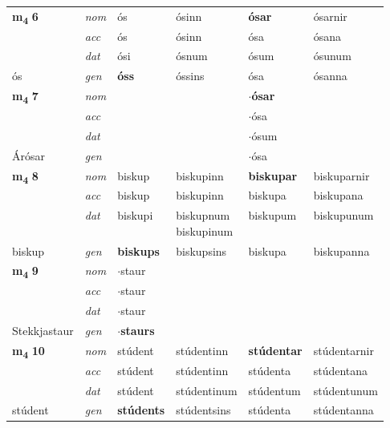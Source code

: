 \begin{longtable}[l]{llllll}
\multirow{3}{*}{{{\textbf{m{\textsubscript{4}}} \Large{\textbf{6}}}}}  & {\footnotesize{{\textit{nom}}}} & ós & ósinn    & \textbf{ósar} & ósarnir  \\*
 &  {\footnotesize{{\textit{acc}}}} & ós  & ósinn   & ósa  & ósana \\*
 &  {\footnotesize{{\textit{dat}}}} & ósi & ósnum   & ósum & ósunum \\*
 {\footnotesize{ós}} &   {\footnotesize{{\textit{gen}}}} & \textbf{óss}  & óssins  & ósa & ósanna \\
\cmidrule{1-6}


\multirow{3}{*}{{{\textbf{m{\textsubscript{4}}} \Large{\textbf{7}}}}}  & {\footnotesize{{\textit{nom}}}} &  &     & \textbf{$\cdot$ósar} &   \\*
 &  {\footnotesize{{\textit{acc}}}} &   &    & $\cdot$ósa  &  \\*
 &  {\footnotesize{{\textit{dat}}}} &  &    & $\cdot$ósum &  \\*
 {\footnotesize{Árósar}} &   {\footnotesize{{\textit{gen}}}} & \textbf{}  &   & $\cdot$ósa &  \\
\cmidrule{1-6}


\multirow{3}{*}{{{\textbf{m{\textsubscript{4}}} \Large{\textbf{8}}}}}  & {\footnotesize{{\textit{nom}}}} & biskup & biskupinn    & \textbf{biskupar} & biskuparnir  \\*
 &  {\footnotesize{{\textit{acc}}}} & biskup  & biskupinn   & biskupa  & biskupana \\*
 &  {\footnotesize{{\textit{dat}}}} & biskupi & \specialcell{biskupnum\\ biskupinum}   & biskupum & biskupunum \\*
 {\footnotesize{biskup}} &   {\footnotesize{{\textit{gen}}}} & \textbf{biskups}  & biskupsins  & biskupa & biskupanna \\
\cmidrule{1-6}


\multirow{3}{*}{{{\textbf{m{\textsubscript{4}}} \Large{\textbf{9}}}}}  & {\footnotesize{{\textit{nom}}}} & $\cdot$staur &     & \textbf{} &   \\*
 &  {\footnotesize{{\textit{acc}}}} & $\cdot$staur  &    &   &  \\*
 &  {\footnotesize{{\textit{dat}}}} & $\cdot$staur &    &  &  \\*
 {\footnotesize{Stekkjastaur}} &   {\footnotesize{{\textit{gen}}}} & \textbf{$\cdot$staurs}  &   &  &  \\
\cmidrule{1-6}


\multirow{3}{*}{{{\textbf{m{\textsubscript{4}}} \Large{\textbf{10}}}}}  & {\footnotesize{{\textit{nom}}}} & stúdent & stúdentinn    & \textbf{stúdentar} & stúdentarnir  \\*
 &  {\footnotesize{{\textit{acc}}}} & stúdent  & stúdentinn   & stúdenta  & stúdentana \\*
 &  {\footnotesize{{\textit{dat}}}} & stúdent & stúdentinum   & stúdentum & stúdentunum \\*
 {\footnotesize{stúdent}} &   {\footnotesize{{\textit{gen}}}} & \textbf{stúdents}  & stúdentsins  & stúdenta & stúdentanna \\
\cmidrule{1-6}



\end{longtable}
